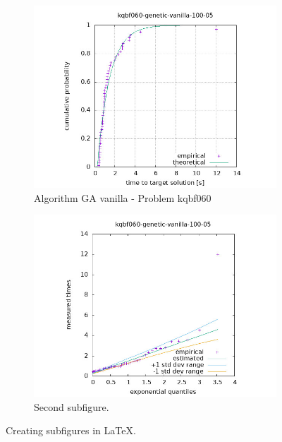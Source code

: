 \begin{figure}[H]
    \centering
    \begin{subfigure}{0.49\textwidth}
        \includegraphics[width=\textwidth]{figure/ttt_plot/kqbf060-genetic-vanilla-100-05-exp.jpeg}
        \caption{Algorithm GA vanilla - Problem kqbf060}
        \label{fig:ga-vanilla-kqbf060-exp}
    \end{subfigure}
    \hfill
    \begin{subfigure}{0.49\textwidth}
        \includegraphics[width=\textwidth]{figure/ttt_plot/kqbf060-genetic-vanilla-100-05-qq.jpeg}
        \caption{Second subfigure.}
        \label{fig:ga-vanilla-kqbf060-qq}
    \end{subfigure}
    \caption{Creating subfigures in \LaTeX.}
    \label{fig:ga-vanilla-kqbf060}
\end{figure}


